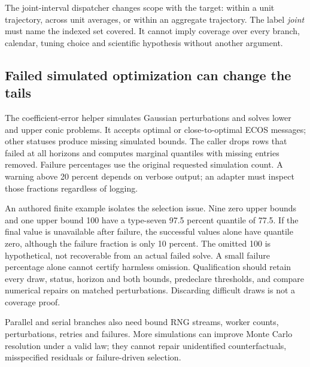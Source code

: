 The joint-interval dispatcher changes scope with the target: within a unit
trajectory, across unit averages, or within an aggregate trajectory. The
label \emph{joint} must name the indexed set covered. It cannot imply
coverage over every branch, calendar, tuning choice and scientific
hypothesis without another argument.~\citep{exec24_scpi_source,exec24_scpi_choice}

\subsection{Failed simulated optimization can change the tails}
The coefficient-error helper simulates Gaussian perturbations and solves
lower and upper conic problems. It accepts optimal or close-to-optimal
ECOS messages; other statuses produce missing simulated bounds. The caller
drops rows that failed at all horizons and computes marginal quantiles
with missing entries removed. Failure percentages use the original
requested simulation count. A warning above 20 percent depends on verbose
output; an adapter must inspect those fractions regardless of logging.
\citep{exec24_scpi_source}

An authored finite example isolates the selection issue. Nine zero upper
bounds and one upper bound 100 have a type-seven 97.5 percent quantile of
77.5. If the final value is unavailable after failure, the successful
values alone have quantile zero, although the failure fraction is only
10 percent. The omitted 100 is hypothetical, not recoverable from an
actual failed solve. A small failure percentage alone cannot certify
harmless omission. Qualification should retain every draw, status, horizon
and both bounds, predeclare thresholds, and compare numerical repairs on
matched perturbations. Discarding difficult draws is not a coverage proof.
\citep{exec24_scpi_choice}

Parallel and serial branches also need bound RNG streams, worker counts,
perturbations, retries and failures. More simulations can improve Monte
Carlo resolution under a valid law; they cannot repair unidentified
counterfactuals, misspecified residuals or failure-driven selection.
\citep{exec24_scpi_source,exec24_scpi_choice}

